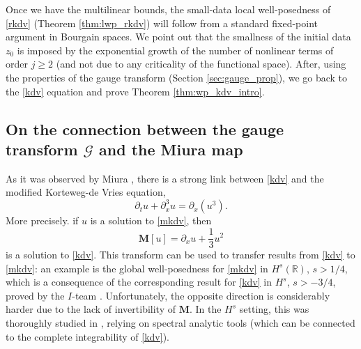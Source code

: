 \documentclass[%
11pt,  reqno]{amsart}
\newcommand{\5}{\textup{V}}
\theoremstyle{remark}
\newcommand{\R}{\mathbb{R}}
\newcommand{\MMb}{\mathbf{M}}
\newcommand{\Gc}{\mathcal{G}}
\numberwithin{equation}{section}
\numberwithin{theorem}{section}
\begin{document}
	\medskip
	
	
	Once we have the multilinear bounds, the small-data local well-posedness of \eqref{rkdv} (Theorem \ref{thm:lwp_rkdv}) will follow from a standard fixed-point argument in Bourgain spaces. We point out that the smallness of the initial data $z_0$ is imposed by the exponential growth of the number of nonlinear terms of order $j\ge 2$ (and not due to any criticality of the functional space). After, using the properties of the gauge transform (Section \ref{sec:gauge_prop}), we go back to the \eqref{kdv} equation and prove Theorem \ref{thm:wp_kdv_intro}.

    

    \subsection{On the connection between the gauge transform $\Gc$ and the Miura map}
		As it was observed by Miura \cite{Miura}, there is a strong link between \eqref{kdv} and the modified Korteweg-de Vries equation,
		\begin{equation}
			\tag{mKdV}\label{mkdv}
			\partial_t u + \partial_x^3 u = \partial_x(u^3).
		\end{equation}
		More precisely. if $u$ is a solution to \eqref{mkdv}, then
		\begin{equation}
			\MMb[u]=\partial_x u +\frac{1}{3}u^2
		\end{equation}
		is a solution to \eqref{kdv}. This transform can be used to transfer results from \eqref{kdv} to \eqref{mkdv}: an example is the global well-posedness for \eqref{mkdv} in $H^s(\R)$, $s>1/4$, which is a consequence of the corresponding result for \eqref{kdv} in $H^s$, $s>-3/4$, proved by the $I$-team \cite{CKSTT_sharp_kdv}. Unfortunately, the opposite direction is considerably harder due to the lack of invertibility of $\MMb$. In the $H^s$ setting, this was thoroughly studied in  \cite{KPST_miura, BuckmasterKoch}, relying on spectral analytic tools (which can be connected to the complete integrability of \eqref{kdv}).
		
\end{document}
